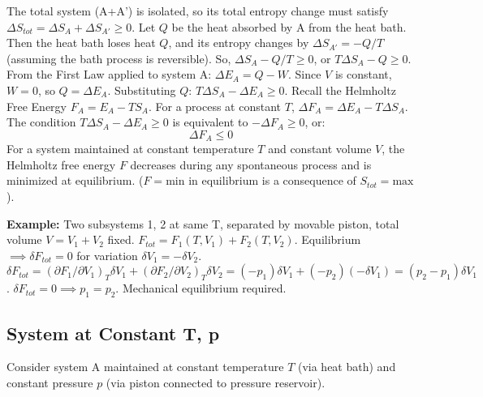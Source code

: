 \documentclass[11pt]{article}
\begin{document}
The total system (A+A') is isolated, so its total entropy change must satisfy $\Delta S_{tot} = \Delta S_A + \Delta S_{A'} \ge 0$.
Let $Q$ be the heat absorbed by A from the heat bath. Then the heat bath loses heat $Q$, and its entropy changes by $\Delta S_{A'} = -Q/T$ (assuming the bath process is reversible).
So, $\Delta S_A - Q/T \ge 0$, or $T \Delta S_A - Q \ge 0$.
From the First Law applied to system A: $\Delta E_A = Q - W$. Since $V$ is constant, $W=0$, so $Q = \Delta E_A$.
Substituting $Q$: $T \Delta S_A - \Delta E_A \ge 0$.
Recall the Helmholtz Free Energy $F_A = E_A - TS_A$. For a process at constant $T$, $\Delta F_A = \Delta E_A - T \Delta S_A$.
The condition $T \Delta S_A - \Delta E_A \ge 0$ is equivalent to $-\Delta F_A \ge 0$, or:
\[ \Delta F_A \le 0 \]
For a system maintained at constant temperature $T$ and constant volume $V$, the Helmholtz free energy $F$ decreases during any spontaneous process and is minimized at equilibrium. ($F=\text{min}$ in equilibrium is a consequence of $S_{tot}=\text{max}$).

\textbf{Example:} Two subsystems 1, 2 at same T, separated by movable piston, total volume $V=V_1+V_2$ fixed.
$F_{tot} = F_1(T,V_1) + F_2(T,V_2)$. Equilibrium $\implies \delta F_{tot} = 0$ for variation $\delta V_1 = -\delta V_2$.
$\delta F_{tot} = (\partial F_1/\partial V_1)_T \delta V_1 + (\partial F_2/\partial V_2)_T \delta V_2 = (-p_1)\delta V_1 + (-p_2)(-\delta V_1) = (p_2-p_1)\delta V_1$.
$\delta F_{tot} = 0 \implies p_1 = p_2$. Mechanical equilibrium required.

\subsection*{System at Constant T, p}

Consider system A maintained at constant temperature $T$ (via heat bath) and constant pressure $p$ (via piston connected to pressure reservoir).

\begin{center}
\end{center}
\end{document}
